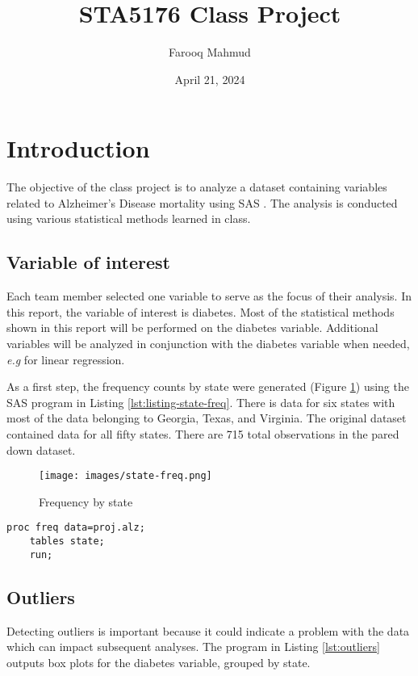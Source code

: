 \documentclass{article}
\title{\vspace{-2cm}STA5176 Class Project}
\author{Farooq Mahmud}
\date{April 21, 2024}
\begin{document}
\maketitle
\tableofcontents

\section{Introduction}
The objective of the class project is to analyze a dataset containing variables related to Alzheimer's Disease mortality\cite{amin2018geographic} using SAS \cite{sasHelpCenter}. The analysis is conducted using various statistical methods learned in class.

\subsection{Variable of interest}
Each team member selected one variable to serve as the focus of their analysis. In this report, the variable of interest is diabetes. Most of the statistical methods shown in this report will be performed on the diabetes variable. Additional variables will be analyzed in conjunction with the diabetes variable when needed, \textit{e.g} for linear regression.

As a first step, the frequency counts by state were generated (Figure \ref{fig:state-freq}) using the SAS program in Listing \ref{lst:listing-state-freq}. There is data for six states with most of the data belonging to Georgia, Texas, and Virginia. The original dataset contained data for all fifty states. There are 715 total observations in the pared down dataset. 


\begin{figure}[ht]
    \centering
    \texttt{[image: images/state-freq.png]}
    \caption{Frequency by state}
    \label{fig:state-freq}
\end{figure}

\begin{lstlisting}[language=SAS,caption=Frequency by state,captionpos=b,label=lst:listing-state-freq]
    proc freq data=proj.alz;
    tables state;
    run;
\end{lstlisting}

\subsection{Outliers}
Detecting outliers is important because it could indicate a problem with the data which can impact subsequent analyses. The program in Listing \ref{lst:outliers} outputs box plots for the diabetes variable, grouped by state.
\end{document}
